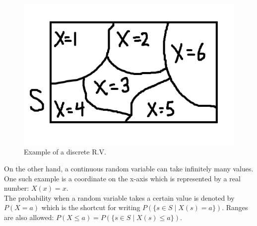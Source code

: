 \documentclass[12pt, a4paper]{article}
\newcounter{exa}
\begin{document}
\begin{figure}[H]
\centering
\includegraphics[width=120mm]{4.png}
\caption{Example of a discrete R.V.}
\end{figure}

On the other hand, a continuous random variable can take infinitely many values. One such example is a coordinate on the x-axis which is represented by a real number: $X(x)=x$. \\

The probability when a random variable takes a certain value is denoted by $P(X=a)$ which is the shortcut for writing $P(\{s \in S \mid X(s)=a\})$. Ranges are also allowed: $P(X\le a)=P(\{s \in S \mid X(s)\le a\})$.
\end{document}
